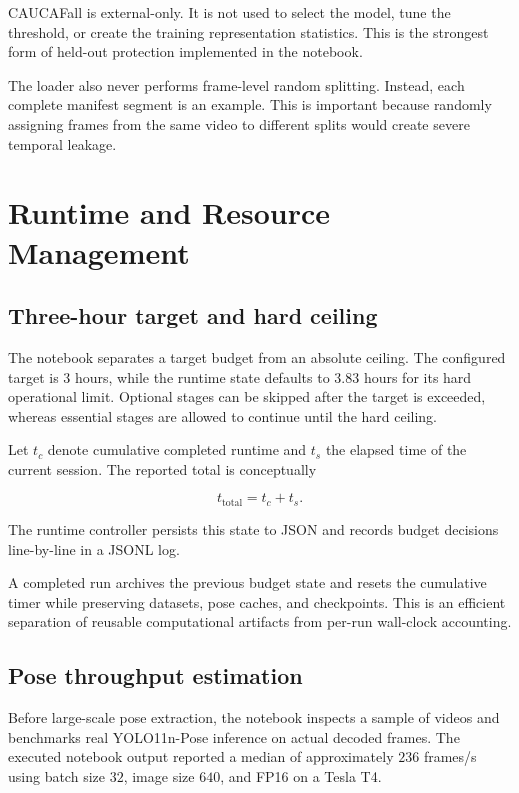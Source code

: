 \documentclass[11pt,a4paper]{article}
\begin{document}
CAUCAFall is external-only. It is not used to select the model, tune the threshold, or create the training representation statistics. This is the strongest form of held-out protection implemented in the notebook.

The loader also never performs frame-level random splitting. Instead, each complete manifest segment is an example. This is important because randomly assigning frames from the same video to different splits would create severe temporal leakage.

\section{Runtime and Resource Management}

\subsection{Three-hour target and hard ceiling}

The notebook separates a target budget from an absolute ceiling. The configured target is $3$ hours, while the runtime state defaults to $3.83$ hours for its hard operational limit. Optional stages can be skipped after the target is exceeded, whereas essential stages are allowed to continue until the hard ceiling.

Let $t_c$ denote cumulative completed runtime and $t_s$ the elapsed time of the current session. The reported total is conceptually

\begin{equation}
t_{\mathrm{total}}
=
t_c + t_s.
\end{equation}

The runtime controller persists this state to JSON and records budget decisions line-by-line in a JSONL log.

A completed run archives the previous budget state and resets the cumulative timer while preserving datasets, pose caches, and checkpoints. This is an efficient separation of reusable computational artifacts from per-run wall-clock accounting.

\subsection{Pose throughput estimation}

Before large-scale pose extraction, the notebook inspects a sample of videos and benchmarks real YOLO11n-Pose inference on actual decoded frames. The executed notebook output reported a median of approximately $236$ frames/s using batch size $32$, image size $640$, and FP16 on a Tesla T4.
\end{document}
